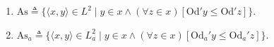 \begin{enumerate}
\item $\mathrm{As} \triangleq \{\langle x, y \rangle \in L^2 \mid y \in x \land (\forall z \in x)[\mathrm{Od}' y \leq \mathrm{Od}' z]\}.$
\item $\mathrm{As}_a \triangleq \{\langle x, y \rangle \in L_a^2 \mid y \in x \land (\forall z \in x)[\mathrm{Od}_a' y \leq \mathrm{Od}_a' z]\}.$
\end{enumerate}
